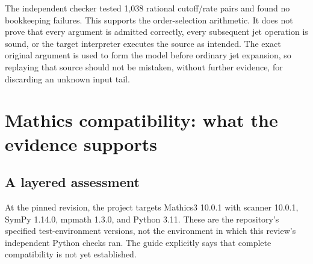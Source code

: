 \documentclass[11pt,letterpaper]{article}
\begin{document}
The independent checker tested 1,038 rational cutoff/rate pairs and found no bookkeeping failures. This supports the order-selection arithmetic. It does not prove that every argument is admitted correctly, every subsequent jet operation is sound, or the target interpreter executes the source as intended. The exact original argument is used to form the model before ordinary jet expansion, so replaying that source should not be mistaken, without further evidence, for discarding an unknown input tail.~\cite{mspecial}

\section{Mathics compatibility: what the evidence supports}
\label{sec:compatibility}

\subsection{A layered assessment}

At the pinned revision, the project targets Mathics3 10.0.1 with scanner 10.0.1, SymPy 1.14.0, mpmath 1.3.0, and Python 3.11. These are the repository's specified test-environment versions, not the environment in which this review's independent Python checks ran. The guide explicitly says that complete compatibility is not yet established.~\cite{requirements,mathicsguide}
\end{document}

